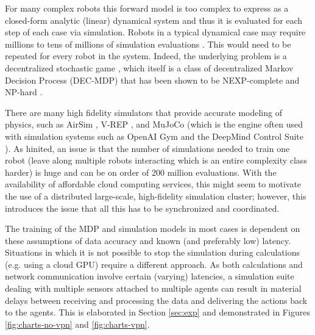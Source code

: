 \documentclass{article}
\let\cite\citep
\begin{document}
For many complex robots this forward model is too complex to express as a closed-form analytic (linear) dynamical system and thus it is evaluated for each step of each case via simulation.  Robots in a typical dynamical case may require millions to tens of millions of simulation evaluations \cite{SAC}.   This would need to be repeated for every robot in the system.   Indeed, the underlying problem is a decentralized stochastic game \cite{redulla2018simulating}, which itself is a class of decentralized Markov Decision Process (DEC-MDP) that has been shown to be NEXP-complete and NP-hard \cite{papadimitriou1986intractable, bernstein2002complexity}.

There are many high fidelity simulators that provide accurate modeling of physics, such as AirSim \cite{shah2018airsim}, V-REP \cite{rohmer2013v}, and MuJoCo \cite{Todorov2012MuJoCo} (which is the engine often used with simulation systems such as OpenAI Gym \cite{Brockman2016Gym} and the DeepMind Control Suite \cite{Tassa2018DMC}).  As hinited, an issue is that the number of simulations needed to train one robot (leave along multiple robots interacting which is an entire complexity class harder) is huge and can be on order of 200 million evaluations.  With the availability of affordable cloud computing services, this might seem to motivate the use of a distributed large-scale, high-fidelity simulation cluster; however, this introduces the issue that all this has to be synchronized and coordinated.

The training of the MDP and simulation models in most cases is dependent on these assumptions of data accuracy and known (and preferably low) latency.  Situations in which it is not possible to stop the simulation during calculations (e.g. using a cloud GPU) require a different approach. %
As both calculations and network communication involve certain (varying) latencies, a simulation suite dealing with multiple sensors attached to multiple agents can result in material delays between receiving and processing the data and delivering the actions back to the agents.   This is elaborated in Section \ref{sec:exp} and demonstrated in Figures \ref{fig:charts-no-vpn} and \ref{fig:charts-vpn}.

\end{document}
